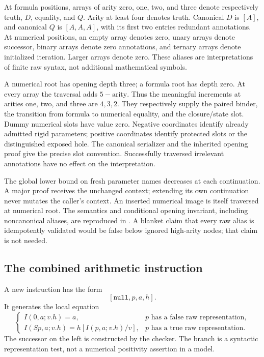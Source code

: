 At formula positions, arrays of arity zero, one, two, and three denote respectively truth, $D$, equality, and $Q$. Arity at least four denotes truth. Canonical $D$ is $[A]$, and canonical $Q$ is $[A,A,A]$, with its first two entries redundant annotations. At numerical positions, an empty array denotes zero, unary arrays denote successor, binary arrays denote zero annotations, and ternary arrays denote initialized iteration. Larger arrays denote zero. These aliases are interpretations of finite raw syntax, not additional mathematical symbols.

A numerical root has opening depth three; a formula root has depth zero. At every array the traversal adds $5-\mathrm{arity}$. Thus the meaningful increments at arities one, two, and three are $4,3,2$. They respectively supply the paired binder, the transition from formula to numerical equality, and the closure/state slot. Dummy numerical slots have value zero. Negative coordinates identify already admitted rigid parameters; positive coordinates identify protected slots or the distinguished exposed hole. The canonical serializer and the inherited opening proof give the precise slot convention. Successfully traversed irrelevant annotations have no effect on the interpretation.

The global lower bound on fresh parameter names decreases at each continuation. A major proof receives the unchanged context; extending its own continuation never mutates the caller's context. An inserted numerical image is itself traversed at numerical root. The semantics and conditional opening invariant, including noncanonical aliases, are reproduced in . A blanket claim that every raw alias is idempotently validated would be false below ignored high-arity nodes; that claim is not needed.

\subsection{The combined arithmetic instruction}
A new instruction has the form
\[
 [\mathtt{null},p,a,h].
\]
It generates the local equation
\[
 \begin{cases}
 I(0,a;v.h)=a,&p\text{ has a false raw representation},\\
 I(Sp,a;v.h)=h[I(p,a;v.h)/v],&p\text{ has a true raw representation}.
 \end{cases}
\]
The successor on the left is constructed by the checker. The branch is a syntactic representation test, not a numerical positivity assertion in a model.

